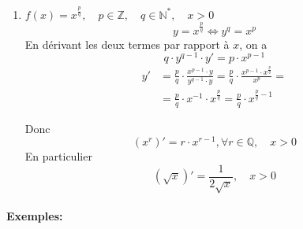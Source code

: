 \documentclass[
    11pt,
    a4paper,
    oneside,
    headinlcude, footinclude,
    twoside,
]{report}
\begin{document}
\begin{enumerate}
    \item $f(x) = x^{\frac{p}{q}}, \quad  p \in \mathbb{Z}, \quad q \in \mathbb{N}^{*},
        \quad x > 0$
             $$y = x^{\frac{p}{q}} \iff y^{q} = x ^{p}$$
             En dérivant les deux termes par rapport à $x$, on a 
             $$q \cdot y ^{q-1} \cdot y' = p \cdot x^{p-1}$$
             \[
                 \begin{split}
                     y' &= \frac{p}{q} \cdot \frac{x^{p-1} \cdot y}{y^{q-1}
                 \cdot y} = \frac{p}{q} \cdot \frac{x^{p-1} \cdot x^{\frac{p}{q}}}{x^{p}}=\\
                 &= \frac{p}{q} \cdot x^{-1} \cdot x^{\frac{p}{q}} = \frac{p }{q}\cdot
                 x^{\frac{p}{q}-1}
                 \end{split}
             \]

        Donc $$(x^{r})' = r \cdot x^{r-1}, \forall r \in \mathbb{Q}, \quad x > 0 $$
        En particulier $$(\sqrt{x})' = \frac{1}{2 \sqrt{x}}, \quad x > 0$$
\end{enumerate}

\paragraph{Exemples:}
\end{document}
